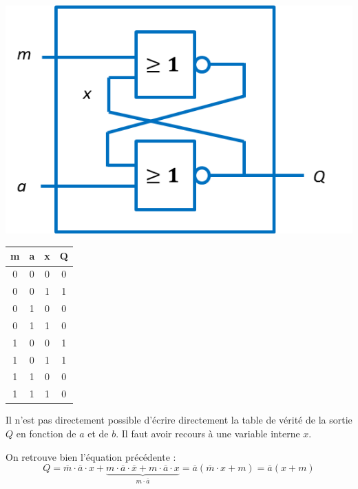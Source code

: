 \documentclass[10pt,fleqn]{article} %
\begin{document}
\begin{minipage}[c]{.3\linewidth}
\begin{center}
\includegraphics[width=\textwidth]{images/mem_eff_nor}
\end{center}
\end{minipage} \hfill
\begin{minipage}[c]{.2\linewidth}
\begin{center}
\begin{tabular}{|c|c|c||c|}
\hline
m & a & x & Q \\
\hline \hline
0 & 0 & 0 & 0 \\\hline
0 & 0 & 1 & 1 \\\hline
0 & 1 & 0 & 0 \\\hline
0 & 1 & 1 & 0 \\\hline
1 & 0 & 0 & 1 \\\hline
1 & 0 & 1 & 1 \\\hline
1 & 1 & 0 & 0 \\\hline
1 & 1 & 1 & 0 \\\hline
\end{tabular}
\end{center}
\end{minipage} \hfill
\begin{minipage}[c]{.48\linewidth}
Il  n'est pas directement possible d'écrire directement la table de vérité de la sortie $Q$ en fonction de $a$ et de $b$. Il faut avoir recours à une variable interne $x$. 

On retrouve bien l'équation précédente : 
$$
Q = \overline{m}\cdot \overline{a} \cdot x + \underbrace{m\cdot \overline{a} \cdot \overline{x} 
+ m\cdot \overline{a} \cdot x}_{m\cdot \overline{a} } = \overline{a} \left(\overline{m} \cdot x + m\right)
= \overline{a} \left( x + m\right)
$$

\end{minipage}
\end{document}
